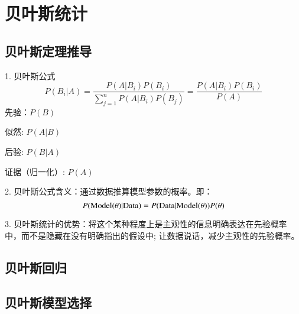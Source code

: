 \chapter{贝叶斯统计}
\section{贝叶斯定理推导}
1. 贝叶斯公式
\begin{equation}
    P(B_i|A)=\frac{P(A|B_i)P(B_i)}{\sum_{j=1}^{n}P(A|B_i)P(B_j)}
    =\frac{P(A|B_i)P(B_i)}{P(A)}
\end{equation}
先验：$P(B)$

似然:  $P(A|B)$

后验:  $P(B|A)$

证据（归一化）:  $P(A)$

2. 贝叶斯公式含义：通过数据推算模型参数的概率。即：
\begin{equation}
    P({\rm{Model}} (\theta)|{\rm{Data}})=
    P({\rm{Data}}|{\rm{Model}}(\theta))P(\theta)
\end{equation}


3. 贝叶斯统计的优势：将这个某种程度上是主观性的信息明确表达在先验概率中，而不是隐藏在没有明确指出的假设中; 让数据说话，减少主观性的先验概率。




\section{贝叶斯回归}

\section{贝叶斯模型选择}

